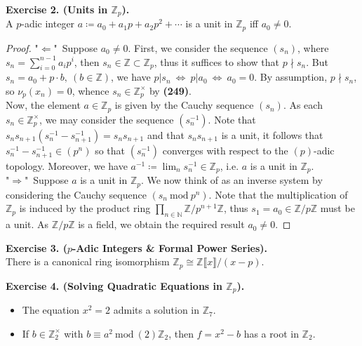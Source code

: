 \documentclass[12pt,a4paper,footinclude=true,headinclude=true]{scrbook} %
\newenvironment{exe}[2][Exercise]
    { \begin{mdframed}[backgroundcolor=gray!20] \textbf{#1 #2.}\\ }
    {  \end{mdframed}}
\begin{document}
\begin{exe}{2. (Units in $\mathbb{Z}_p$)}
    A $p$-adic integer $a\coloneqq a_0+a_1p+a_2p^2+\cdots$ is a unit in $\mathbb{Z}_p$ iff $a_0\neq0$.
\end{exe}
\begin{proof}
    "$\Leftarrow$"\ Suppose $a_0\neq0$. First, we consider the sequence $(s_n)$, where $s_n=\sum_{i=0}^{n-1}a_ip^i$, then $s_n\in\mathbb{Z}\subset\mathbb{Z}_p$, thus it suffices to show that $p\nmid s_n$. But $s_n=a_0+p\cdot b,\ (b\in\mathbb{Z})$, we have $p|s_n\ \Leftrightarrow\ p|a_0\ \Leftrightarrow\ a_0=0$. By assumption, $p\nmid s_n$, so $\nu_p(x_n)=0$, whence $s_n\in\mathbb{Z}_p^\times$ by \textbf{(249)}.\\
    Now, the element $a\in\mathbb{Z}_p$ is given by the Cauchy sequence $(s_n)$. As each $s_n\in\mathbb{Z}_p^\times$, we may consider the sequence $(s_n^{-1})$. Note that $s_ns_{n+1}(s_n^{-1}-s_{n+1}^{-1})=s_ns_{n+1}$ and that $s_ns_{n+1}$ is a unit, it follows that $s_n^{-1}-s_{n+1}^{-1}\in(p^n)$ so that $(s_n^{-1})$ converges with respect to the $(p)$-adic topology. Moreover, we have $a^{-1}\coloneqq\lim_ns_n^{-1}\in\mathbb{Z}_p$, i.e. $a$ is a unit in $\mathbb{Z}_p$.\\
    "$\Rightarrow$"\ Suppose $a$ is a unit in $\mathbb{Z}_p$. We now think of as an inverse system by considering the Cauchy sequence $(s_n\ \mathrm{mod}\ p^n)$. Note that the multiplication of $\mathbb{Z}_p$ is induced by the product ring $\prod_{n\in\mathbb{N}}\mathbb{Z}/p^{n+1}\mathbb{Z}$, thus $s_1=a_0\in\mathbb{Z}/p\mathbb{Z}$ must be a unit. As $\mathbb{Z}/p\mathbb{Z}$ is a field, we obtain the required result $a_0\neq0$.
\end{proof}

\begin{exe}{3. ($p$-Adic Integers \& Formal Power Series)}
    There is a canonical ring isomorphism $\mathbb{Z}_p\cong\mathbb{Z}\llbracket x\rrbracket/(x-p)$.
\end{exe}

\begin{exe}{4. (Solving Quadratic Equations in $\mathbb{Z}_p$)}
    \begin{itemize}
        \item[(a)] The equation $x^2=2$ admits a solution in $\mathbb{Z}_7$.
        \item[(b)] If $b\in\mathbb{Z}_2^\times$ with $b\equiv a^2\ \mathrm{mod}\ (2)\mathbb{Z}_2$, then $f=x^2-b$ has a root in $\mathbb{Z}_2$.
    \end{itemize}
\end{exe}
\end{document}
